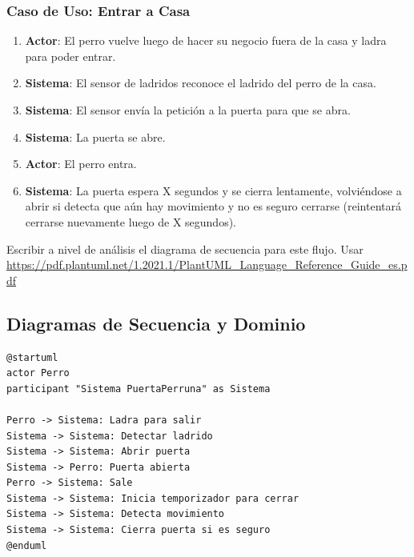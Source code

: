 \subsubsection{Caso de Uso: Entrar a Casa}
\begin{enumerate}
    \item \textbf{Actor}: El perro vuelve luego de hacer su negocio fuera de la casa y ladra para poder entrar.
    \item \textbf{Sistema}: El sensor de ladridos reconoce el ladrido del perro de la casa.
    \item \textbf{Sistema}: El sensor envía la petición a la puerta para que se abra.
    \item \textbf{Sistema}: La puerta se abre.
    \item \textbf{Actor}: El perro entra.
    \item \textbf{Sistema}: La puerta espera X segundos y se cierra lentamente, volviéndose a abrir si detecta que aún hay movimiento y no es seguro cerrarse (reintentará cerrarse nuevamente luego de X segundos).
\end{enumerate}

\begin{tcolorbox}[colback=gray!5!white,colframe=orange!60!gray,title=TODO]
Escribir a nivel de análisis el diagrama de secuencia para este flujo. Usar \url{https://pdf.plantuml.net/1.2021.1/PlantUML_Language_Reference_Guide_es.pdf}
\end{tcolorbox}

\subsection{Diagramas de Secuencia y Dominio}
\begin{tcolorbox}[colback=gray!5!white,colframe=orange!60!gray,title=Diagrama de Secuencia en PlantUML]
\begin{verbatim}
@startuml
actor Perro
participant "Sistema PuertaPerruna" as Sistema

Perro -> Sistema: Ladra para salir
Sistema -> Sistema: Detectar ladrido
Sistema -> Sistema: Abrir puerta
Sistema -> Perro: Puerta abierta
Perro -> Sistema: Sale
Sistema -> Sistema: Inicia temporizador para cerrar
Sistema -> Sistema: Detecta movimiento
Sistema -> Sistema: Cierra puerta si es seguro
@enduml
\end{verbatim}
\end{tcolorbox}

